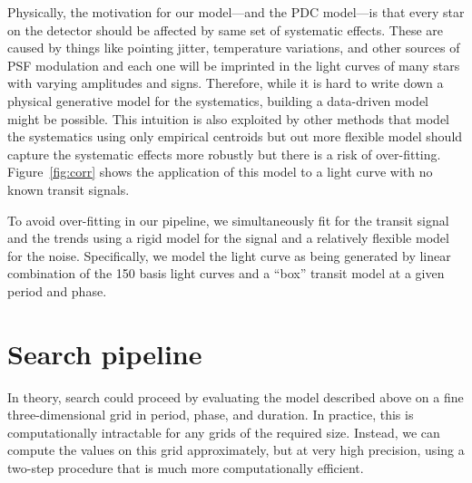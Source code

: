 \documentclass[12pt,preprint]{aastex}
\newcommand{\figref}[1]{\ref{fig:#1}}
\newcommand{\Fig}[1]{Figure~\figref{#1}}
\begin{document}
Physically, the motivation for our model---and the PDC model---is that every
star on the detector should be affected by same set of systematic effects.
These are caused by things like pointing jitter, temperature variations, and
other sources of PSF modulation and each one will be imprinted in the light
curves of many stars with varying amplitudes and signs.
Therefore, while it is hard to write down a physical generative model for the
systematics, building a data-driven model might be possible.
This intuition is also exploited by other methods that model the systematics
using only empirical centroids \citep{Vanderburg:2014, Crossfield:2015} but
out more flexible model should capture the systematic effects more robustly
but there is a risk of over-fitting.
\Fig{corr} shows the application of this model to a light curve with no known
transit signals.

To avoid over-fitting in our pipeline, we simultaneously fit for the transit
signal and the trends using a rigid model for the signal and a relatively
flexible model for the noise.
Specifically, we model the light curve as being generated by linear
combination of the 150 basis light curves and a ``box'' transit model at a
given period and phase.


\section{Search pipeline}
\label{sec:search}

In theory, search could proceed by evaluating the model described above on a
fine three-dimensional grid in period, phase, and duration.
In practice, this is computationally intractable for any grids of the
required size.
Instead, we can compute the values on this grid approximately, but at very
high precision, using a two-step procedure that is much more computationally
efficient.
\end{document}
